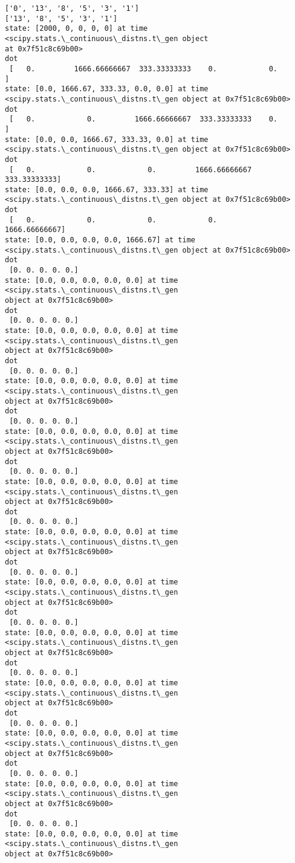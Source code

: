 \documentclass[11pt]{article}
\begin{document}
    \begin{Verbatim}[commandchars=\\\{\}]
['0', '13', '8', '5', '3', '1']
['13', '8', '5', '3', '1']
state: [2000, 0, 0, 0, 0] at time <scipy.stats.\_continuous\_distns.t\_gen object
at 0x7f51c8c69b00>
dot
 [   0.         1666.66666667  333.33333333    0.            0.        ]
state: [0.0, 1666.67, 333.33, 0.0, 0.0] at time
<scipy.stats.\_continuous\_distns.t\_gen object at 0x7f51c8c69b00>
dot
 [   0.            0.         1666.66666667  333.33333333    0.        ]
state: [0.0, 0.0, 1666.67, 333.33, 0.0] at time
<scipy.stats.\_continuous\_distns.t\_gen object at 0x7f51c8c69b00>
dot
 [   0.            0.            0.         1666.66666667  333.33333333]
state: [0.0, 0.0, 0.0, 1666.67, 333.33] at time
<scipy.stats.\_continuous\_distns.t\_gen object at 0x7f51c8c69b00>
dot
 [   0.            0.            0.            0.         1666.66666667]
state: [0.0, 0.0, 0.0, 0.0, 1666.67] at time
<scipy.stats.\_continuous\_distns.t\_gen object at 0x7f51c8c69b00>
dot
 [0. 0. 0. 0. 0.]
state: [0.0, 0.0, 0.0, 0.0, 0.0] at time <scipy.stats.\_continuous\_distns.t\_gen
object at 0x7f51c8c69b00>
dot
 [0. 0. 0. 0. 0.]
state: [0.0, 0.0, 0.0, 0.0, 0.0] at time <scipy.stats.\_continuous\_distns.t\_gen
object at 0x7f51c8c69b00>
dot
 [0. 0. 0. 0. 0.]
state: [0.0, 0.0, 0.0, 0.0, 0.0] at time <scipy.stats.\_continuous\_distns.t\_gen
object at 0x7f51c8c69b00>
dot
 [0. 0. 0. 0. 0.]
state: [0.0, 0.0, 0.0, 0.0, 0.0] at time <scipy.stats.\_continuous\_distns.t\_gen
object at 0x7f51c8c69b00>
dot
 [0. 0. 0. 0. 0.]
state: [0.0, 0.0, 0.0, 0.0, 0.0] at time <scipy.stats.\_continuous\_distns.t\_gen
object at 0x7f51c8c69b00>
dot
 [0. 0. 0. 0. 0.]
state: [0.0, 0.0, 0.0, 0.0, 0.0] at time <scipy.stats.\_continuous\_distns.t\_gen
object at 0x7f51c8c69b00>
dot
 [0. 0. 0. 0. 0.]
state: [0.0, 0.0, 0.0, 0.0, 0.0] at time <scipy.stats.\_continuous\_distns.t\_gen
object at 0x7f51c8c69b00>
dot
 [0. 0. 0. 0. 0.]
state: [0.0, 0.0, 0.0, 0.0, 0.0] at time <scipy.stats.\_continuous\_distns.t\_gen
object at 0x7f51c8c69b00>
dot
 [0. 0. 0. 0. 0.]
state: [0.0, 0.0, 0.0, 0.0, 0.0] at time <scipy.stats.\_continuous\_distns.t\_gen
object at 0x7f51c8c69b00>
dot
 [0. 0. 0. 0. 0.]
state: [0.0, 0.0, 0.0, 0.0, 0.0] at time <scipy.stats.\_continuous\_distns.t\_gen
object at 0x7f51c8c69b00>
dot
 [0. 0. 0. 0. 0.]
state: [0.0, 0.0, 0.0, 0.0, 0.0] at time <scipy.stats.\_continuous\_distns.t\_gen
object at 0x7f51c8c69b00>
dot
 [0. 0. 0. 0. 0.]
state: [0.0, 0.0, 0.0, 0.0, 0.0] at time <scipy.stats.\_continuous\_distns.t\_gen
object at 0x7f51c8c69b00>

\end{Verbatim}
\end{document}
